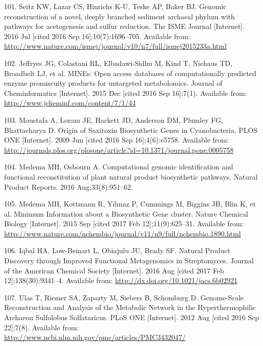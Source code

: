 \documentclass[12pt,twoside]{reedthesis}
\begin{document}
  \hypertarget{ref-seitz_genomic_2016}{}
  101. Seitz KW, Lazar CS, Hinrichs K-U, Teske AP, Baker BJ. Genomic
  reconstruction of a novel, deeply branched sediment archaeal phylum with
  pathways for acetogenesis and sulfur reduction. The ISME Journal
  {[}Internet{]}. 2016 Jul {[}cited 2016 Sep 16{]};10(7):1696--705.
  Available from:
  \url{http://www.nature.com/ismej/journal/v10/n7/full/ismej2015233a.html}
  
  \hypertarget{ref-jeffryes_mines_2015}{}
  102. Jeffryes JG, Colastani RL, Elbadawi-Sidhu M, Kind T, Niehaus TD,
  Broadbelt LJ, et al. MINEs: Open access databases of computationally
  predicted enzyme promiscuity products for untargeted metabolomics.
  Journal of Cheminformatics {[}Internet{]}. 2015 Dec {[}cited 2016 Sep
  16{]};7(1). Available from: \url{http://www.jcheminf.com/content/7/1/44}
  
  \hypertarget{ref-moustafa_origin_2009}{}
  103. Moustafa A, Loram JE, Hackett JD, Anderson DM, Plumley FG,
  Bhattacharya D. Origin of Saxitoxin Biosynthetic Genes in Cyanobacteria.
  PLOS ONE {[}Internet{]}. 2009 Jun {[}cited 2016 Sep 16{]};4(6):e5758.
  Available from:
  \url{http://journals.plos.org/plosone/article?id=10.1371/journal.pone.0005758}
  
  \hypertarget{ref-medema_computational_2016}{}
  104. Medema MH, Osbourn A. Computational genomic identification and
  functional reconstitution of plant natural product biosynthetic
  pathways. Natural Product Reports. 2016 Aug;33(8):951--62.
  
  \hypertarget{ref-medema_minimum_2015}{}
  105. Medema MH, Kottmann R, Yilmaz P, Cummings M, Biggins JB, Blin K, et
  al. Minimum Information about a Biosynthetic Gene cluster. Nature
  Chemical Biology {[}Internet{]}. 2015 Sep {[}cited 2017 Feb
  12{]};11(9):625--31. Available from:
  \url{http://www.nature.com/nchembio/journal/v11/n9/full/nchembio.1890.html}
  
  \hypertarget{ref-iqbal_natural_2016}{}
  106. Iqbal HA, Low-Beinart L, Obiajulu JU, Brady SF. Natural Product
  Discovery through Improved Functional Metagenomics in Streptomyces.
  Journal of the American Chemical Society {[}Internet{]}. 2016 Aug
  {[}cited 2017 Feb 12{]};138(30):9341--4. Available from:
  \url{http://dx.doi.org/10.1021/jacs.6b02921}
  
  \hypertarget{ref-ulas_genome-scale_2012}{}
  107. Ulas T, Riemer SA, Zaparty M, Siebers B, Schomburg D. Genome-Scale
  Reconstruction and Analysis of the Metabolic Network in the
  Hyperthermophilic Archaeon Sulfolobus Solfataricus. PLoS ONE
  {[}Internet{]}. 2012 Aug {[}cited 2016 Sep 22{]};7(8). Available from:
  \url{http://www.ncbi.nlm.nih.gov/pmc/articles/PMC3432047/}
  
\end{document}

